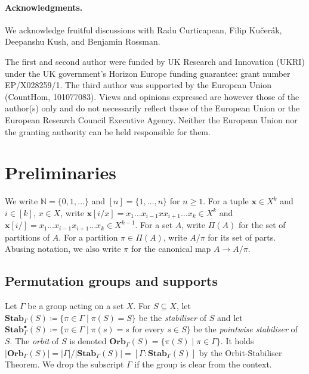 \documentclass[11pt, DIV=15]{scrarticle}
\theoremstyle{definition}
\theoremstyle{plain}
\theoremstyle{remark}
\newcommand{\Stab}{\mathbf{Stab}}
\newcommand{\StabP}{\Stab^{\bullet}}
\newcommand{\Orb}{\mathbf{Orb}}
\begin{document}
\paragraph*{Acknowledgments.}We acknowledge fruitful discussions with Radu Curticapean, Filip Kučerák, Deepanshu Kush, and Benjamin Rossman.

The first and second author were funded by UK Research and Innovation (UKRI) under
the UK government’s Horizon Europe funding guarantee: grant number EP/X028259/1.
The third author was supported by the European Union (CountHom, 101077083). Views and opinions expressed are however those of the author(s) only and do not necessarily reflect those of the European Union or the European Research Council Executive Agency. Neither the European Union nor the granting
authority can be held responsible for them.



\section{Preliminaries}
\label{sec:shortPreliminaries}

We write $\mathbb{N} = \{0,1,\dots\}$ and $[n] = \{1, \dots, n\}$ for $n \geq 1$.
For a tuple $\boldsymbol{x} \in X^k$ and $i \in [k]$, $x \in X$, write $\boldsymbol{x}[i/x] = x_1 \dots x_{i-1} x x_{i+1} \dots x_k \in X^k$ and $\boldsymbol{x}[i/] = x_1 \dots x_{i-1} x_{i+1} \dots x_k \in X^{k-1}$.
For a set $A$,
write $\Pi(A)$ for the set of partitions of $A$.
For a partition $\pi \in \Pi(A)$,
write $A/\pi$ for its set of parts.
Abusing notation, we also write $\pi$ for the canonical map $A \to A/\pi$.



\subsection{Permutation groups and supports}
\label{sec:supports}
Let $\Gamma$ be a group acting on a set $X$.  
For $S \subseteq X$, let $\Stab_\Gamma(S) \coloneqq \{ \pi \in \Gamma \mid \pi(S) = S\}$ be the \emph{stabiliser} of $S$ and let $\StabP_\Gamma(S) \coloneqq \{ \pi \in \Gamma \mid \pi(s) = s \text{ for every } s\in S\}$ be the \emph{pointwise stabiliser} of $S$.
The \emph{orbit} of $S$ is denoted $\Orb_{\Gamma}(S) = \{ \pi(S) \mid \pi \in \Gamma  \}$. It holds $|\Orb_\Gamma(S)| = |\Gamma| / |\Stab_\Gamma(S)| = [\Gamma : \Stab_\Gamma(S)]$ by the Orbit-Stabiliser Theorem.
We drop the subscript $\Gamma$ if the group is clear from the context.
\end{document}
